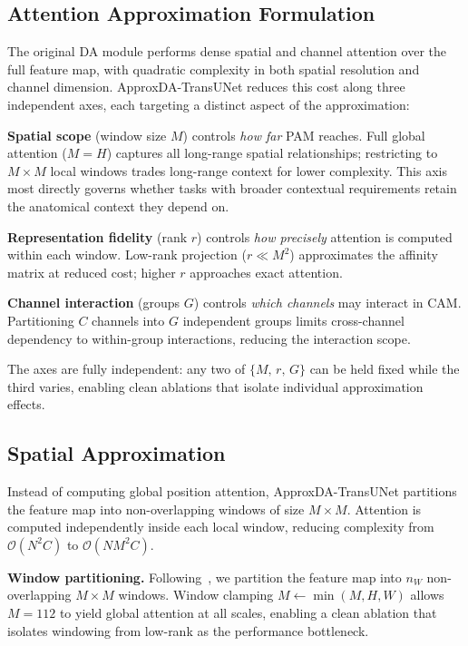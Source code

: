 \subsection{Attention Approximation Formulation}

The original DA module performs dense spatial and channel attention over the full feature map, with quadratic complexity in both spatial resolution and channel dimension. ApproxDA-TransUNet reduces this cost along three independent axes, each targeting a distinct aspect of the approximation:

\textbf{Spatial scope} (window size $M$) controls \emph{how far} PAM reaches. Full global attention ($M{=}H$) captures all long-range spatial relationships; restricting to $M{\times}M$ local windows trades long-range context for lower complexity. This axis most directly governs whether tasks with broader contextual requirements retain the anatomical context they depend on.

\textbf{Representation fidelity} (rank $r$) controls \emph{how precisely} attention is computed within each window. Low-rank projection ($r \ll M^2$) approximates the affinity matrix at reduced cost; higher $r$ approaches exact attention.

\textbf{Channel interaction} (groups $G$) controls \emph{which channels} may interact in CAM. Partitioning $C$ channels into $G$ independent groups limits cross-channel dependency to within-group interactions, reducing the interaction scope.

The axes are fully independent: any two of $\{M,\,r,\,G\}$ can be held fixed while the third varies, enabling clean ablations that isolate individual approximation effects.

\subsection{Spatial Approximation}

Instead of computing global position attention, ApproxDA-TransUNet partitions the feature map into non-overlapping windows of size $M{\times}M$. Attention is computed independently inside each local window, reducing complexity from $\mathcal{O}(N^2C)$ to $\mathcal{O}(NM^2C)$.

\textbf{Window partitioning.} Following~\cite{liu2021swin}, we partition the feature map into $n_W$ non-overlapping $M{\times}M$ windows. Window clamping $M \leftarrow \min(M, H, W)$ allows $M{=}112$ to yield global attention at all scales, enabling a clean ablation that isolates windowing from low-rank as the performance bottleneck.

